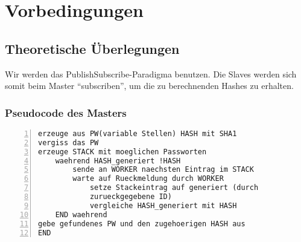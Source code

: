 \chapter{Vorbedingungen}

\section{Theoretische Überlegungen}
Wir werden das PublishSubscribe-Paradigma benutzen. Die Slaves werden sich somit beim Master \enquote{subscriben}, um die zu berechnenden Hashes zu erhalten.

\subsection{Pseudocode des Masters}
\begin{lstlisting}[basicstyle=\ttfamily,numbers=left,numberstyle=\footnotesize\ttfamily,backgroundcolor=\color{sourcegray}]
erzeuge aus PW(variable Stellen) HASH mit SHA1
vergiss das PW
erzeuge STACK mit moeglichen Passworten
	waehrend HASH_generiert !HASH
		sende an WORKER naechsten Eintrag im STACK
		warte auf Rueckmeldung durch WORKER
    		setze Stackeintrag auf generiert (durch 
    		zurueckgegebene ID)
    		vergleiche HASH_generiert mit HASH
	END waehrend
gebe gefundenes PW und den zugehoerigen HASH aus
END
\end{lstlisting}




